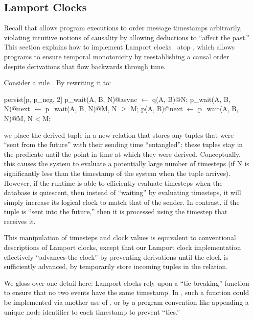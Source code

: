 
\subsection{Lamport Clocks}
\label{sec:lamport}
Recall that \lang allows program executions to order message timestamps arbitrarily, violating intuitive notions of causality by allowing deductions to ``affect the past.''
This section explains how to implement Lamport
clocks~\cite{timeclocks} atop \lang, which allows programs to ensure
temporal monotonicity by reestablishing a causal order
despite derivations that flow backwards through time.

Consider a rule .  By
rewriting it to:

\begin{Dedalus}
persist[p, p\_neg, 2]
p\_wait(A, B, N)@async \(\leftarrow\) q(A, B)@N;
p\_wait(A, B, N)@next \(\leftarrow\) p\_wait(A, B, N)@M, N \(\ge\) M;
p(A, B)@next \(\leftarrow\) p\_wait(A, B, N)@M, N < M;
\end{Dedalus}
\noindent
we place the derived tuple in a new relation  that
stores any tuples that were ``sent from the future'' with their sending time ``entangled''; these tuples stay in the  predicate  until the point in
time at which they were derived.  Conceptually, this causes the system
to evaluate a potentially large number of timesteps (if N is
significantly less than the timestamp of the system when the tuple
arrives).  However, if the runtime is able to efficiently evaluate
timesteps when the database is quiescent, then
instead of ``waiting'' by evaluating timesteps, it will simply
increase its logical clock to match that of the sender.  In contrast,
if the tuple is ``sent into the future,'' then it is processed using
the timestep that receives it.

This manipulation of timesteps and clock values is equivalent to
conventional descriptions of Lamport clocks, except that our Lamport
clock implementation effectively ``advances the clock'' by preventing derivations until the clock is sufficiently advanced, by temporarily store incoming tuples
in the  relation.

We gloss over one detail here: Lamport clocks rely
upon a ``tie-breaking'' function to ensure that no two events have the
same timestamp.  In \lang, such a function could be implemented via another use of , or by a program convention like
appending a unique node identifier to each timestamp to prevent ``ties.''

